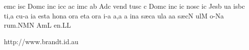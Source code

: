 \sgn {}em\punctum c\egn
{}is\punctum c\egn
\spatium
\sgn Dom\punctum c\egn
\sgn {}in\punctum c\egn
\sgn {}ic\punctum c\egn
\sgn {}a{}\punctum c\egn
\spatium
{}im\punctum c\egn
\sgn {}a{}\punctum b\egn
\spatium
\sgn {}Ad\punctum c\egn
\sgn ven\punctum d\egn
\sgn tus\punctum c\egn
\spatium
\custos c
\lineaproxima
\sgn Dom\punctum c\egn
\sgn {}in\punctum c\egn
\sgn {}i{}\punctum c\egn
\spatium
\sgn nos\punctum c\egn
{}i{}\punctum c\egn
\spatium
\sgn Jes\punctum b\egn
\sgn {}u{}\punctum a\egn
\spatium
{}is\pes bc\egn
\sgn ti,\punctum a\egn
\spatium
\divisiominima
\spatium
\sgn cu-\punctum a\egn
\sgn {}i{}\punctum a\egn
\spatium
\sgn {}e{st}\punctum a\egn
\spatium
\sgn hon\punctum a\egn
\sgn {}or\punctum a\egn
\spatium
\sgn {}et\punctum a\egn
\spatium
{}or\punctum a\egn
\sgn {}i-\punctum a\egn
\sgn {}a,\punctum a\egn
\spatium
\custos a
\lineaproxima
\sgn {}in\punctum a\egn
\spatium
\sgn s{\ae}c\punctum a\egn
\sgn {}ul\punctum a\egn
\sgn {}a{}\punctum a\egn
\spatium
\sgn s{\ae}c\punctum N\egn
\sgn {}ul\punctum M\egn
\sgn {}o-\pes Na\egn
\sgn ru{m.}\clivis NM\augmentum N\egn
\spatium
\divisiomaior
\spatium
\sgn { }Am\punctum L\egn
\sgn {}e{n.}\punctum L\augmentum L\egn
\spatium
\Finisgregoriana

\vfill

\centerline{http://www.brandt.id.au}

\eject
\bye
